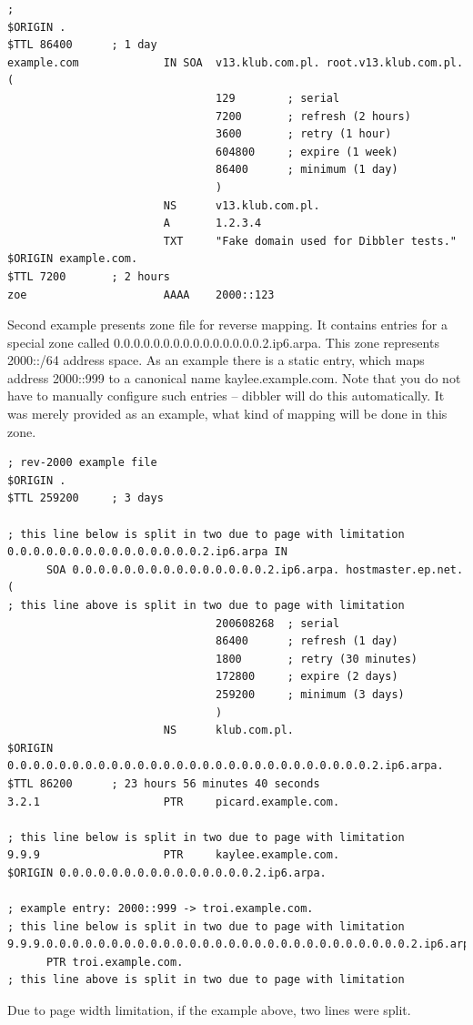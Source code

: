 \begin{lstlisting}
; 
$ORIGIN .
$TTL 86400      ; 1 day
example.com             IN SOA  v13.klub.com.pl. root.v13.klub.com.pl. (
                                129        ; serial
                                7200       ; refresh (2 hours)
                                3600       ; retry (1 hour)
                                604800     ; expire (1 week)
                                86400      ; minimum (1 day)
                                )
                        NS      v13.klub.com.pl.
                        A       1.2.3.4
                        TXT     "Fake domain used for Dibbler tests."
$ORIGIN example.com.
$TTL 7200       ; 2 hours
zoe                     AAAA    2000::123
\end{lstlisting}

Second example presents zone file for reverse mapping. It contains
entries for a special zone called
0.0.0.0.0.0.0.0.0.0.0.0.0.0.0.2.ip6.arpa. This zone represents 2000::/64
address space. As an example there is a static entry, which maps address
2000::999 to a canonical name kaylee.example.com. Note that you do not
have to manually configure such entries -- dibbler will do this
automatically. It was merely provided as an example, what kind
of mapping will be done in this zone.

\begin{lstlisting}
; rev-2000 example file
$ORIGIN .
$TTL 259200     ; 3 days

; this line below is split in two due to page with limitation
0.0.0.0.0.0.0.0.0.0.0.0.0.0.0.2.ip6.arpa IN 
      SOA 0.0.0.0.0.0.0.0.0.0.0.0.0.0.0.2.ip6.arpa. hostmaster.ep.net. (
; this line above is split in two due to page with limitation
                                200608268  ; serial
                                86400      ; refresh (1 day)
                                1800       ; retry (30 minutes)
                                172800     ; expire (2 days)
                                259200     ; minimum (3 days)
                                )
                        NS      klub.com.pl.
$ORIGIN 0.0.0.0.0.0.0.0.0.0.0.0.0.0.0.0.0.0.0.0.0.0.0.0.0.0.0.0.2.ip6.arpa.
$TTL 86200      ; 23 hours 56 minutes 40 seconds
3.2.1                   PTR     picard.example.com.

; this line below is split in two due to page with limitation
9.9.9                   PTR     kaylee.example.com.
$ORIGIN 0.0.0.0.0.0.0.0.0.0.0.0.0.0.0.2.ip6.arpa.

; example entry: 2000::999 -> troi.example.com.
; this line below is split in two due to page with limitation
9.9.9.0.0.0.0.0.0.0.0.0.0.0.0.0.0.0.0.0.0.0.0.0.0.0.0.0.0.0.0.2.ip6.arpa 
      PTR troi.example.com.
; this line above is split in two due to page with limitation
\end{lstlisting}
\Note Due to page width limitation, if the example above, two lines were
split. 

